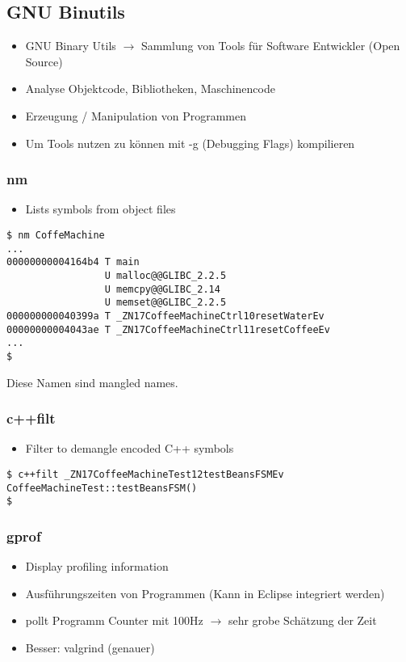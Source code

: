\subsection{GNU Binutils}
\begin{itemize}
    \item GNU Binary Utils $\rightarrow$ Sammlung von Tools für Software Entwickler (Open Source)
    \item Analyse Objektcode, Bibliotheken, Maschinencode
    \item Erzeugung / Manipulation von Programmen
    \item Um Tools nutzen zu können mit -g (Debugging Flags) kompilieren
\end{itemize}

\subsubsection{nm}
\begin{itemize}
  \item Lists symbols from object files
\end{itemize}
\begin{lstlisting}[style=bash]
$ nm CoffeMachine
...
00000000004164b4 T main
                 U malloc@@GLIBC_2.2.5
                 U memcpy@@GLIBC_2.14
                 U memset@@GLIBC_2.2.5
000000000040399a T _ZN17CoffeeMachineCtrl10resetWaterEv
00000000004043ae T _ZN17CoffeeMachineCtrl11resetCoffeeEv
...
$
\end{lstlisting}
Diese Namen sind mangled names.

\subsubsection{c++filt}
\begin{itemize}
    \item Filter to demangle encoded C++ symbols
\end{itemize}
\begin{lstlisting}[style=bash]
$ c++filt _ZN17CoffeeMachineTest12testBeansFSMEv
CoffeeMachineTest::testBeansFSM()
$
\end{lstlisting}

\subsubsection{gprof}
\begin{itemize}
    \item Display profiling information
    \item Ausführungszeiten von Programmen (Kann in Eclipse integriert werden)
    \item pollt Programm Counter mit 100Hz $\rightarrow$ sehr grobe Schätzung der Zeit
    \item Besser: valgrind (genauer)
\end{itemize}

